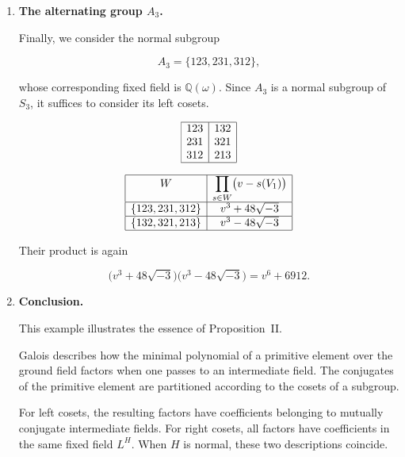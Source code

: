 \documentclass[a4paper,11pt]{article}
\begin{document}
\begin{enumerate}
	Multiplying these three factors gives
	
	\[
	\begin{aligned}
		&(v^2+6\sqrt[3]{2}\,v+12\sqrt[3]{4})
		(v^2-6\sqrt[3]{2}\,v+12\sqrt[3]{4})
		(v^2+12\sqrt[3]{4})\\
		&\qquad
		=
		v^6+6912.
	\end{aligned}
	\]
	
	The polynomial on the right-hand side is the minimal polynomial of \(V_1\) over
	\(\mathbb{Q}\).
	
	\item \textbf{The alternating group \(A_3\).}
	
	Finally, we consider the normal subgroup
	
	\[
	A_3=\{123,231,312\},
	\]
	
	whose corresponding fixed field is \(\mathbb{Q}(\omega)\). Since \(A_3\) is a normal subgroup of \(S_3\), it suffices to consider its left cosets.
	
	\begin{equation}
		\label{eq:tabel2223}
		\begin{array}{|c|c|}
			\hline
			123 & 132\\
			231 & 321\\
			312 & 213\\
			\hline
		\end{array}
	\end{equation}
	
	\[
	\begin{array}{|c|c|}
		\hline
		W &
		\displaystyle\prod_{s\in W}\bigl(v-s(V_1)\bigr)\\
		\hline
		\{123,231,312\}
		&
		v^3+48\sqrt{-3}
		\\
		\hline
		\{132,321,213\}
		&
		v^3-48\sqrt{-3}
		\\
		\hline
	\end{array}
	\]
	
	Their product is again
	
	\[
	\bigl(v^3+48\sqrt{-3}\bigr)
	\bigl(v^3-48\sqrt{-3}\bigr)
	=
	v^6+6912.
	\]
	
	\item \textbf{Conclusion.}
	
	This example illustrates the essence of Proposition~II.
	
	Galois describes how the minimal polynomial of a primitive element over the ground field factors when one passes to an intermediate field. The conjugates of the primitive element are partitioned according to the cosets of a subgroup.
	
	For left cosets, the resulting factors have coefficients belonging to mutually conjugate intermediate fields. For right cosets, all factors have coefficients in the same fixed field \(L^H\). When \(H\) is normal, these two descriptions coincide.
	
\end{enumerate}
\end{document}
